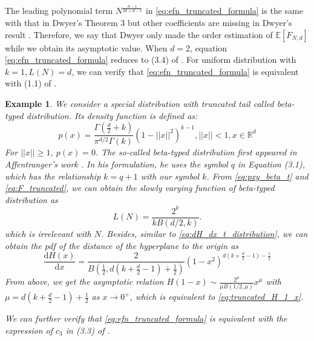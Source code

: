 \documentclass[conference,a4paper]{IEEEtran}
\def\E{\mathbb{E}}
\def\dd{\mathrm{d}}
\newtheorem{example}{Example}
\begin{document}
 The leading polynomial term $N^{\frac{d-1}{2k+d-1}}$ in \eqref{eq:efn_truncated_formula}
 is the same with that in Dwyer's Theorem 3
 but other coefficients are missing in Dwyer's result
 \cite{dwyer1991convex}. Therefore, we say that Dwyer only made the order estimation
 of $\E[F_{N,d}]$ while we obtain its asymptotic value.
 When $d=2$, equation \eqref{eq:efn_truncated_formula} reduces to (3.4) of \cite{carnal1970konvexe}.
 For uniform distribution with $k=1, L(N)=d$, we can verify that
 \eqref{eq:efn_truncated_formula} is equivalent with (1.1)
 of \cite{raynaud1970enveloppe}.
 \begin{example}\label{ex:beta_typed}
  We consider a special distribution with truncated tail called
  beta-typed distribution. Its density function is defined as:
  \begin{equation}\label{eq:pxy_beta_t}
    p(x) = \frac{\Gamma(\frac{d}{2}+ k)}{\pi^{d/2} \Gamma(k)} (1-||x||^2)^{k-1},
    ||x|| <1, x \in \mathbb{R}^d
\end{equation}
 For $||x||\geq 1$, $p(x)=0$.
 The so-called beta-typed distribution first appeared in Affentranger's work
 \cite{affentranger1991convex}.
 In his formulation,
 he uses the symbol $q$ in Equation (3.1), which has the relationship  $k=q+1$ with our symbol $k$.
 From \eqref{eq:pxy_beta_t} and \eqref{eq:F_truncated}, we can obtain the slowly varying function of beta-typed distribution
 as
 \begin{equation}\label{eq:beta_typed_L_N}
  L(N)=\frac{2^k}{kB(d/2,k)}.
 \end{equation}
 which is irrelevant with $N$.
 Besides, similar to \eqref{eq:dH_dx_t_distribution},
 we can obtain the pdf of the distance of the hyperplane to the origin as
\begin{equation}
     \frac{\dd H(x)}{\dd x} = \frac{2}{B(\frac{1}{2}, d(k+\frac{d}{2}-1)+\frac{1}{2})}\left(1 -x^2\right)^{d(k+\frac{d}{2}-1)-\frac{1}{2}} 
\end{equation}
From above, we get the asymptotic relation $H(1-x) \sim \frac{2^{\mu}}{\mu B(1/2, \mu)}
x^{\mu}$ with $\mu=d(k+\frac{d}{2}-1)+\frac{1}{2}$ as $x\to 0^+$,
which is equivalent to \eqref{eq:truncated_H_1_x}.

 We can further verify that
 \eqref{eq:efn_truncated_formula} is equivalent with the expression of $c_3$
 in (3.3) of \cite{affentranger1991convex}.
 \end{example}
\end{document}
